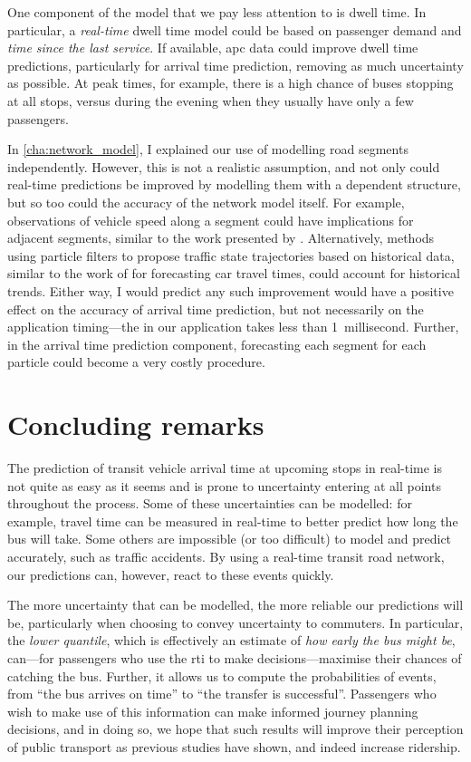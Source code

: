 One component of the model that we pay less attention to is dwell time. In particular, a \emph{real-time} dwell time model could be based on passenger demand and \emph{time since the last service}. If available, \gls{apc} data could improve dwell time predictions, particularly for arrival time prediction, removing as much uncertainty as possible. At peak times, for example, there is a high chance of buses stopping at all stops, versus during the evening when they usually have only a few passengers.



In \cref{cha:network_model}, I explained our use of modelling road segments independently. However, this is not a realistic assumption, and not only could real-time predictions be improved by modelling them with a dependent structure, but so too could the accuracy of the network model itself. For example, observations of vehicle speed along a segment could have implications for adjacent segments, similar to the work presented by \citet{Julio_2016}. Alternatively, methods using particle filters to propose traffic state trajectories based on historical data, similar to the work of \citet{Chen_2014} for forecasting car travel times, could account for historical trends. Either way, I would predict any such improvement would have a positive effect on the accuracy of arrival time prediction, but not necessarily on the application timing---the \kf{} in our application takes less than 1~millisecond. Further, in the arrival time prediction component, forecasting each segment for each particle could become a very costly procedure.


\section{Concluding remarks}

The prediction of transit vehicle arrival time at upcoming stops in real-time is not quite as easy as it seems and is prone to uncertainty entering at all points throughout the process. Some of these uncertainties can be modelled: for example, travel time can be measured in real-time to better predict how long the bus will take. Some others are impossible (or too difficult) to model and predict accurately, such as traffic accidents. By using a real-time transit road network, our predictions can, however, react to these events quickly.


The more uncertainty that can be modelled, the more reliable our predictions will be, particularly when choosing to convey uncertainty to commuters. In particular, the \emph{lower quantile}, which is effectively an estimate of \emph{how early the bus might be}, can---for passengers who use the \gls{rti} to make decisions---maximise their chances of catching the bus. Further, it allows us to compute the probabilities of events, from ``the bus arrives on time'' to ``the transfer is successful''. Passengers who wish to make use of this information can make informed journey planning decisions, and in doing so, we hope that such results will improve their perception of public transport as previous studies have shown, and indeed increase ridership.
